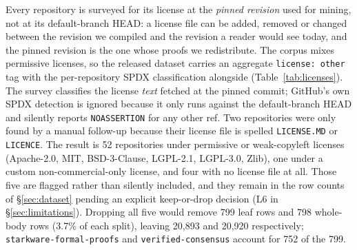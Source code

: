 \documentclass{article}
\begin{document}
Every repository is surveyed for its license at the \emph{pinned revision} used for mining,
not at its default-branch HEAD: a license file can be added, removed or changed between the
revision we compiled and the revision a reader would see today, and the pinned revision is the
one whose proofs we redistribute. The corpus mixes permissive licenses, so the released dataset
carries an aggregate \texttt{license: other} tag with the per-repository SPDX classification
alongside (Table~\ref{tab:licenses}). The survey classifies the license \emph{text} fetched at
the pinned commit; GitHub's own SPDX detection is ignored because it only runs against the
default-branch HEAD and silently reports \texttt{NOASSERTION} for any other ref. Two repositories
were only found by a manual follow-up because their license file is spelled \texttt{LICENSE.MD}
or \texttt{LICENCE}. The result is 52 repositories under permissive or weak-copyleft licenses
(Apache-2.0, MIT, BSD-3-Clause, LGPL-2.1, LGPL-3.0, Zlib), one under a custom non-commercial-only
license, and four with no license file at all. Those five are flagged rather than silently
included, and they remain in the row counts of \S\ref{sec:dataset} pending an explicit
keep-or-drop decision (L6 in \S\ref{sec:limitations}). Dropping all five would remove 799 leaf
rows and 798 whole-body rows (3.7\% of each split), leaving 20{,}893 and 20{,}920 respectively;
\texttt{starkware-formal-proofs} and \texttt{verified-consensus} account for 752 of the 799.
\end{document}
